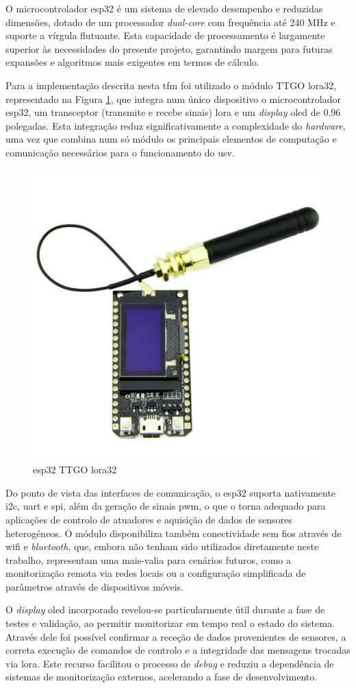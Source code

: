 O microcontrolador \acrfull{esp32} é um sistema de elevado desempenho e reduzidas dimensões, dotado de um processador \emph{dual-core} com frequência até 240 MHz e suporte a vírgula flutuante. Esta capacidade de processamento é largamente superior às necessidades do presente projeto, garantindo margem para futuras expansões e algoritmos mais exigentes em termos de cálculo.  

Para a implementação descrita nesta \gls{tfm} foi utilizado o módulo TTGO \gls{lora}32, representado na Figura \ref{fig:lora32}, que integra num único dispositivo o microcontrolador \gls{esp32}, um transceptor (transmite e recebe sinais) \gls{lora} e um \emph{display} \gls{oled} de 0.96 polegadas. Esta integração reduz significativamente a complexidade do \emph{\emph{hardware}}, uma vez que combina num só módulo os principais elementos de computação e comunicação necessários para o funcionamento do \gls{usv}.  

\begin{figure}[H]
    \centering
    \includegraphics[width=0.33\linewidth]{figuras/lora32.png}
    \caption{\gls{esp32} TTGO \gls{lora}32}
    \label{fig:lora32}
\end{figure}

Do ponto de vista das interfaces de comunicação, o \gls{esp32} suporta nativamente \gls{i2c}, \gls{uart} e \gls{spi}, além da geração de sinais \gls{pwm}, o que o torna adequado para aplicações de controlo de atuadores e aquisição de dados de sensores heterogéneos. O módulo disponibiliza também conectividade sem fios através de \gls{wifi} e \emph{bluetooth}, que, embora não tenham sido utilizados diretamente neste trabalho, representam uma mais-valia para cenários futuros, como a monitorização remota via redes locais ou a configuração simplificada de parâmetros através de dispositivos móveis.  

O \emph{display} \gls{oled} incorporado revelou-se particularmente útil durante a fase de testes e validação, ao permitir monitorizar em tempo real o estado do sistema. Através dele foi possível confirmar a receção de dados provenientes de sensores, a correta execução de comandos de controlo e a integridade das mensagens trocadas via \gls{lora}. Este recurso facilitou o processo de \emph{debug} e reduziu a dependência de sistemas de monitorização externos, acelerando a fase de desenvolvimento.  

